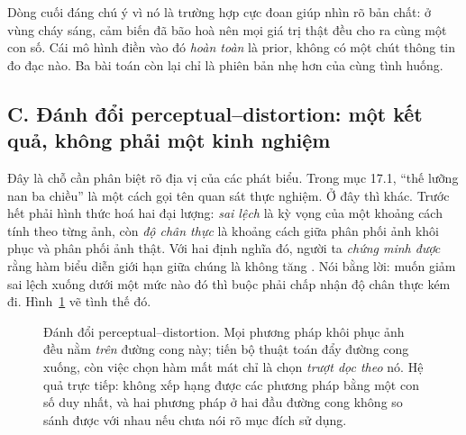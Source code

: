 \documentclass[../../../deep_learning.tex]{subfiles}
\begin{document}
Dòng cuối đáng chú ý vì nó là trường hợp cực đoan giúp nhìn rõ bản chất: ở vùng cháy sáng, cảm biến đã bão hoà nên mọi giá trị thật đều cho ra cùng một con số. Cái mô hình điền vào đó \emph{hoàn toàn} là prior, không có một chút thông tin đo đạc nào. Ba bài toán còn lại chỉ là phiên bản nhẹ hơn của cùng tình huống.

\subsection{C. Đánh đổi perceptual--distortion: một kết quả, không phải một kinh nghiệm}
Đây là chỗ cần phân biệt rõ địa vị của các phát biểu. Trong mục 17.1, ``thế lưỡng nan ba chiều'' là một cách gọi tên quan sát thực nghiệm. Ở đây thì khác. Trước hết phải hình thức hoá hai đại lượng: \emph{sai lệch} là kỳ vọng của một khoảng cách tính theo từng ảnh, còn \emph{độ chân thực} là khoảng cách giữa phân phối ảnh khôi phục và phân phối ảnh thật. Với hai định nghĩa đó, người ta \emph{chứng minh được} rằng hàm biểu diễn giới hạn giữa chúng là không tăng \cite{blau2018perception}. Nói bằng lời: muốn giảm sai lệch xuống dưới một mức nào đó thì buộc phải chấp nhận độ chân thực kém đi. Hình~\ref{fig:pd-tradeoff} vẽ tình thế đó.

\begin{figure}[H]\centering
{}
\caption{Đánh đổi perceptual--distortion. Mọi phương pháp khôi phục ảnh đều nằm \emph{trên} đường cong này; tiến bộ thuật toán đẩy đường cong xuống, còn việc chọn hàm mất mát chỉ là chọn \emph{trượt dọc theo} nó. Hệ quả trực tiếp: không xếp hạng được các phương pháp bằng một con số duy nhất, và hai phương pháp ở hai đầu đường cong không so sánh được với nhau nếu chưa nói rõ mục đích sử dụng.}
\label{fig:pd-tradeoff}
\end{figure}
\end{document}
